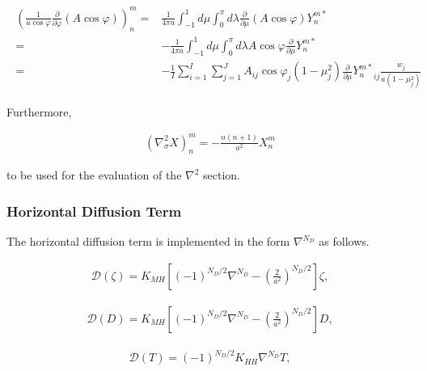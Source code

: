 \begin{eqnarray}
\begin{aligned}
  \left( \frac{1}{a\cos\varphi}
         \frac{\partial{}}{\partial {\varphi}} (A\cos\varphi) \right)_n^m
    = & \frac{1}{4 \pi a}
         \int_{-1}^{1} d \mu \int_{0}^{\pi} d \lambda
           \frac{\partial{}}{\partial {\mu}} (A\cos\varphi) Y_n^{m *}  \\
    = & - \frac{1}{4 \pi a}
         \int_{-1}^{1} d \mu \int_{0}^{\pi} d \lambda
           A \cos\varphi \frac{\partial }{\partial \mu} Y_n^{m *}
            \\
    = & - \frac{1}{I} \sum_{i=1}^{I} \sum_{j=1}^{J}
          A_{ij}  \cos\varphi_j
          (1-\mu_j^2)  \frac{\partial }{\partial \mu}
          {Y_n^{m *}}_{ij} \frac{w_j}{a(1-\mu_j^{2})}
\end{aligned}
\end{eqnarray}

Furthermore,

\begin{eqnarray}
     \left( \nabla^{2}_{\sigma} X \right)_n^m
       =  - \frac{n(n+1)}{a^{2}} X_n^m
\end{eqnarray}

to be used for the evaluation of the \(\nabla^2\) section.

\hypertarget{horizontal-diffusion-term}{%
\subsubsection{Horizontal Diffusion Term}\label{horizontal-diffusion-term}}

The horizontal diffusion term is implemented in the form \(\nabla^{N_D}\) as follows.

\begin{eqnarray}
  {\mathcal D}(\zeta) = K_{MH}
                      \left[ (-1)^{N_D/2} \nabla^{N_D}
                              - \left( \frac{2}{a^2} \right)^{N_D/2}
                      \right]
                    \zeta ,
\end{eqnarray}

\begin{eqnarray}
     {\mathcal D}(D) = K_{MH}
                      \left[ (-1)^{N_D/2} \nabla^{N_D}
                              - \left( \frac{2}{a^2} \right)^{N_D/2}
                      \right]
                    D ,
\end{eqnarray}

\begin{eqnarray}
    {\mathcal D}(T) = (-1)^{N_D/2} K_{HH} \nabla^{N_D} T ,
\end{eqnarray}

